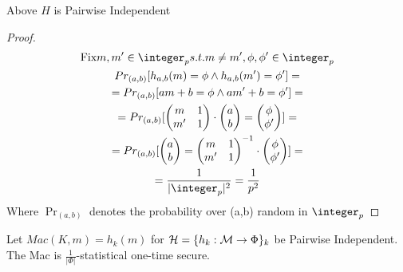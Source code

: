 \begin{theorem}
    Above $H$ is Pairwise Independent
\end{theorem}
\begin{proof}
    \begin{gather*}
        \text{Fix} m,m' \in \integer_p s.t. m\neq m', \phi,\phi' \in \integer_p\\
        Pr_{(a,b)}[h_{a,b}(m)=\phi \wedge h_{a,b}(m')=\phi']=\\
        =Pr_{(a,b)}[am+b=\phi \wedge am'+b=\phi']=\\
        =Pr_{(a,b)}[
        \begin{pmatrix}
            m & 1 \\
            m' & 1
        \end{pmatrix}
        \cdot
        \begin{pmatrix}
            a \\
            b
        \end{pmatrix}
        =
        \begin{pmatrix}
            \phi \\
            \phi'
        \end{pmatrix}
        ]=\\
        =Pr_{(a,b)}[
        \begin{pmatrix}
            a \\
            b
        \end{pmatrix}
        =
        \begin{pmatrix}
            m & 1 \\
            m' & 1
        \end{pmatrix}^{-1}
        \cdot
        \begin{pmatrix}
            \phi \\
            \phi'
        \end{pmatrix}
        ]=\\
        =\frac{1}{|\integer_p|^2}=\frac{1}{p^2}
    \end{gather*}
    Where $\Pr_{(a,b)}$ denotes the probability over (a,b) random in $\integer_p$
\end{proof}

\begin{theorem}
    Let $Mac(K,m)=h_k(m)$ for $\mathcal{H}=\{h_k:\mathcal{M} \to \Phi \}_k$ be Pairwise Independent. The Mac is $\frac{1}{|\Phi|}$-statistical one-time secure. 
\end{theorem}

